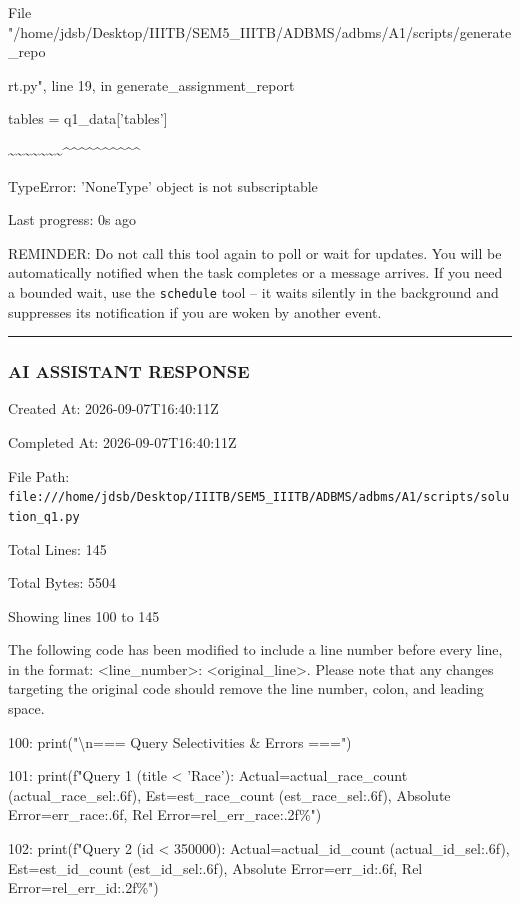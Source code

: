 \documentclass[11pt,a4paper]{article}
\begin{document}
File "/home/jdsb/Desktop/IIITB/SEM5\_IIITB/ADBMS/adbms/A1/scripts/generate\_repo

rt.py", line 19, in generate\_assignment\_report

tables = q1\_data['tables']

\textasciitilde{}\textasciitilde{}\textasciitilde{}\textasciitilde{}\textasciitilde{}\textasciitilde{}\textasciitilde{}\textasciicircum{}\textasciicircum{}\textasciicircum{}\textasciicircum{}\textasciicircum{}\textasciicircum{}\textasciicircum{}\textasciicircum{}\textasciicircum{}\textasciicircum{}

TypeError: 'NoneType' object is not subscriptable


Last progress: 0s ago



REMINDER: Do not call this tool again to poll or wait for updates. You will be automatically notified when the task completes or a message arrives. If you need a bounded wait, use the \texttt{schedule} tool -- it waits silently in the background and suppresses its notification if you are woken by another event.


\hrule

\subsubsection{AI ASSISTANT RESPONSE}

Created At: 2026-09-07T16:40:11Z

Completed At: 2026-09-07T16:40:11Z

File Path: \texttt{file:///home/jdsb/Desktop/IIITB/SEM5\_IIITB/ADBMS/adbms/A1/scripts/solution\_q1.py}

Total Lines: 145

Total Bytes: 5504

Showing lines 100 to 145

The following code has been modified to include a line number before every line, in the format: <line\_number>: <original\_line>. Please note that any changes targeting the original code should remove the line number, colon, and leading space.

100:     print("\textbackslash{}n=== Query Selectivities \& Errors ===")

101:     print(f"Query 1 (title < 'Race'): Actual={actual\_race\_count} ({actual\_race\_sel:.6f}), Est={est\_race\_count} ({est\_race\_sel:.6f}), Absolute Error={err\_race:.6f}, Rel Error={rel\_err\_race:.2f}\%")

102:     print(f"Query 2 (id < 350000): Actual={actual\_id\_count} ({actual\_id\_sel:.6f}), Est={est\_id\_count} ({est\_id\_sel:.6f}), Absolute Error={err\_id:.6f}, Rel Error={rel\_err\_id:.2f}\%")
\end{document}
